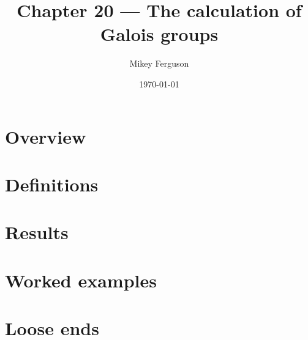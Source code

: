 \documentclass[11pt]{article}
\title{Chapter 20 --- The calculation of Galois groups}
\author{Mikey Ferguson}
\date{\today}
\begin{document}
\maketitle
\tableofcontents
\bigskip

\section{Overview}

\section{Definitions}

\section{Results}

\section{Worked examples}

\section{Loose ends}
\end{document}
